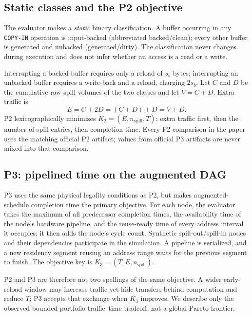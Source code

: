 \subsection{Static classes and the P2 objective}

The evaluator makes a \emph{static} binary classification. A buffer occurring in any \texttt{COPY-IN} operation is input-backed (abbreviated backed/clean); every other buffer is generated and unbacked (generated/dirty). The classification never changes during execution and does not infer whether an access is a read or a write.

Interrupting a backed buffer requires only a reload of $s_b$ bytes; interrupting an unbacked buffer requires a write-back and a reload, charging $2s_b$. Let $C$ and $D$ be the cumulative raw spill volumes of the two classes and let $V=C+D$. Extra traffic is
\begin{equation}\label{eq:supp-extra}
 E=C+2D=(C+D)+D=V+D.
\end{equation}
P2 lexicographically minimizes $K_2=(E,n_{\mathrm{spill}},T)$: extra traffic first, then the number of spill entries, then completion time. Every P2 comparison in the paper uses the matching official P2 artifact; values from official P3 artifacts are never mixed into that comparison.

\subsection{P3: pipelined time on the augmented DAG}

P3 uses the same physical legality conditions as P2, but makes augmented-schedule completion time the primary objective. For each node, the evaluator takes the maximum of all predecessor completion times, the availability time of the node's hardware pipeline, and the reuse-ready time of every address interval it occupies; it then adds the node's cycle count. Synthetic spill-out/spill-in nodes and their dependencies participate in the simulation. A pipeline is serialized, and a new residency segment reusing an address range waits for the previous segment to finish. The objective key is $K_3=(T,E,n_{\mathrm{spill}})$.

P2 and P3 are therefore not two spellings of the same objective. A wider early-reload window may increase traffic yet hide transfers behind computation and reduce $T$; P3 accepts that exchange when $K_3$ improves. We describe only the observed bounded-portfolio traffic--time tradeoff, not a global Pareto frontier.

